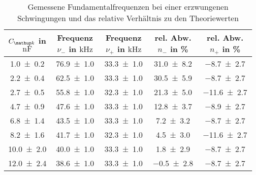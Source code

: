 \begin{table}
\centering
\caption{ Gemessene Fundamentalfrequenzen bei einer erzwungenen Schwingungen und das relative Verhältnis zu den Theoriewerten}
\label{fig:teilb_schwingungen_prak_theo}
\begin{tabular}{S S S S S }
\toprule
{$C\ua{k}$ in $\si{\nano\farad}$} & {Frequenz $\nu_-$ in $\si{\kilo\hertz}$} & {Frequenz $\nu_+$ in $\si{\kilo\hertz}$}& {rel. Abw. $n_-$ in \%} & {rel. Abw. $n_+$ in \%}  \\ 
\midrule
 \num{1.0\pm0.2} & \num{76.9\pm1.0} & \num{33.3\pm1.0} & \num{31.0\pm8.2} & \num{-8.7\pm2.7}\\
\num{2.2\pm0.4} & \num{62.5\pm1.0} & \num{33.3\pm1.0} & \num{30.5\pm5.9} & \num{-8.7\pm2.7}\\
\num{2.7\pm0.5} & \num{55.8\pm1.0} & \num{32.3\pm1.0} & \num{21.3\pm5.0} & \num{-11.6\pm2.7}\\
\num{4.7\pm0.9} & \num{47.6\pm1.0} & \num{33.3\pm1.0} & \num{12.8\pm3.7} & \num{-8.9\pm2.7}\\
\num{6.8\pm1.4} & \num{43.5\pm1.0} & \num{33.3\pm1.0} & \num{7.2\pm3.2} & \num{-8.7\pm2.7}\\
\num{8.2\pm1.6} & \num{41.7\pm1.0} & \num{32.3\pm1.0} & \num{4.5\pm3.0} & \num{-11.6\pm2.7}\\
\num{10.0\pm2.0} & \num{40.0\pm1.0} & \num{33.3\pm1.0} & \num{1.8\pm2.9} & \num{-8.7\pm2.7}\\
\num{12.0\pm2.4} & \num{38.6\pm1.0} & \num{33.3\pm1.0} & \num{-0.5\pm2.8} & \num{-8.7\pm2.7}\\
\bottomrule
\end{tabular}
\end{table}
